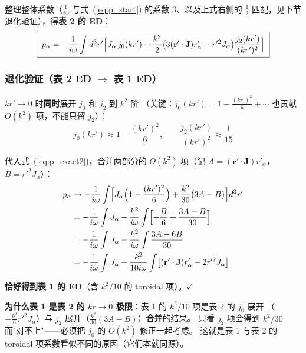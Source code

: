 整理整体系数（$\frac{1}{i\omega}$ 与式~(\ref{eq:p_start}) 的系数 $3$、以及上式右侧的 $\frac12$
匹配，见下节退化验证），得\textbf{表 2 的 ED}：
\begin{equation}
  \boxed{\;
  p_\alpha = -\frac{1}{i\omega}\int d^3r'\Bigl[
    J_\alpha\,j_0(kr')
    + \frac{k^2}{2}\bigl(3(\mathbf{r}'\cdot\mathbf{J})r'_\alpha - r'^2J_\alpha\bigr)
    \frac{j_2(kr')}{(kr')^2}
  \Bigr]
  \;}
  \label{eq:p_exact2}
\end{equation}

\subsubsection{退化验证（表 2 ED $\to$ 表 1 ED）}

$kr'\to0$ 时\textbf{同时}展开 $j_0$ 和 $j_2$ 到 $k^2$ 阶
（关键：$j_0(kr')=1-\frac{(kr')^2}{6}+\cdots$ 也贡献 $O(k^2)$ 项，不能只留 $j_2$）：
\begin{equation}
  j_0(kr') \approx 1 - \frac{(kr')^2}{6},\qquad
  \frac{j_2(kr')}{(kr')^2} \approx \frac{1}{15}
\end{equation}

代入式~(\ref{eq:p_exact2})，合并两部分的 $O(k^2)$ 项（记 $A=(\mathbf{r}'\cdot\mathbf{J})r'_\alpha$，$B=r'^2J_\alpha$）：
\begin{align}
  p_\alpha &\to -\frac{1}{i\omega}\int\Bigl[
    J_\alpha\Bigl(1-\frac{(kr')^2}{6}\Bigr) + \frac{k^2}{30}\bigl(3A - B\bigr)\Bigr]d^3r' \notag\\
  &= -\frac{1}{i\omega}\int J_\alpha - \frac{k^2}{i\omega}\int\Bigl[-\frac{B}{6} + \frac{3A-B}{30}\Bigr] \notag\\
  &= -\frac{1}{i\omega}\int J_\alpha - \frac{k^2}{i\omega}\int\frac{3A-6B}{30} \notag\\
  &= -\frac{1}{i\omega}\int J_\alpha - \frac{k^2}{10i\omega}\int\bigl[(\mathbf{r}'\cdot\mathbf{J})r'_\alpha - 2r'^2J_\alpha\bigr]
\end{align}

\textbf{恰好得到表 1 的 ED}（含 $k^2/10$ 的 toroidal 项）。$\checkmark$

\begin{noteworthy}
\textbf{为什么表 1 是表 2 的 $kr\to0$ 极限}：表 1 的 $k^2/10$ 项是表 2 的 $j_0$ 展开
（$-\frac{k^2}{6}r'^2J_\alpha$）与 $j_2$ 展开（$\frac{k^2}{30}(3A-B)$）\textbf{合并}的结果。
只看 $j_2$ 项会得到 $k^2/30$ 而"对不上"——必须把 $j_0$ 的 $O(k^2)$ 修正一起考虑。
这就是表 1 与表 2 的 toroidal 项系数看似不同的原因（它们本就同源）。
\end{noteworthy}

